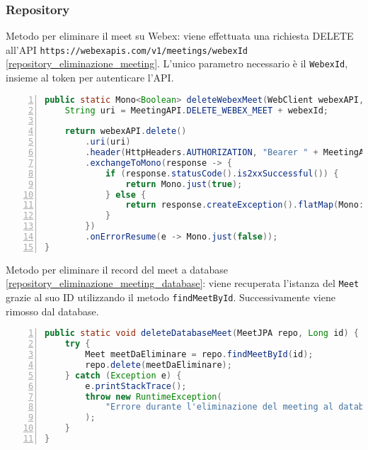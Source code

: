 \subsubsection{Repository}
\noindent Metodo per eliminare il meet su Webex: viene effettuata una richiesta DELETE all'API \texttt{https://webexapis.com/v1/meetings/webexId} 
\ref{repository_eliminazione_meeting}.
L'unico parametro necessario è il \texttt{WebexId}, insieme al token per autenticare l'API.
\begin{lstlisting}[language=java, frame=lines, basicstyle=\ttfamily\scriptsize, numbers=left, 
    caption={chiamata all'API per eliminare un meet su Webex}, label={repository_eliminazione_meeting}]
 public static Mono<Boolean> deleteWebexMeet(WebClient webexAPI, String webexId) {
	String uri = MeetingAPI.DELETE_WEBEX_MEET + webexId;

	return webexAPI.delete()
	    .uri(uri)
	    .header(HttpHeaders.AUTHORIZATION, "Bearer " + MeetingAPI.TOKEN)
	    .exchangeToMono(response -> {
	        if (response.statusCode().is2xxSuccessful()) {
	            return Mono.just(true);
	        } else {
	            return response.createException().flatMap(Mono::error);
	        }
	    })
	    .onErrorResume(e -> Mono.just(false));
}
\end{lstlisting}
\noindent Metodo per eliminare il record del meet a database \ref{repository_eliminazione_meeting_database}: 
viene recuperata l'istanza del \texttt{Meet} grazie al suo ID
utilizzando il metodo \texttt{findMeetById}. Successivamente viene rimosso dal database.
\begin{lstlisting}[language=java, frame=lines, basicstyle=\ttfamily\scriptsize, numbers=left,
    caption={chiamata al metodo per eliminare un meet a database}, label={repository_eliminazione_meeting_database}]
public static void deleteDatabaseMeet(MeetJPA repo, Long id) {	
    try {     
        Meet meetDaEliminare = repo.findMeetById(id);      
        repo.delete(meetDaEliminare);      
    } catch (Exception e) {
        e.printStackTrace();
        throw new RuntimeException(
            "Errore durante l'eliminazione del meeting al database", e
        );
    }
}
\end{lstlisting}